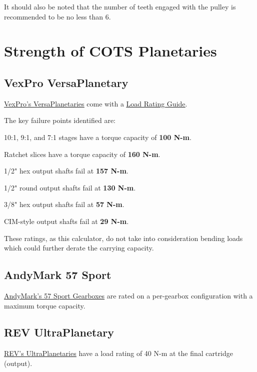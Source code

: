 \documentclass[10pt,letterpaper]{article}
\begin{document}
	It should also be noted that the number of teeth engaged with the pulley is recommended to be no less than 6.

\section{Strength of COTS Planetaries}
	\subsection{VexPro VersaPlanetary}
	\href{https://www.vexrobotics.com/versaplanetary.html}{\underline{VexPro's VersaPlanetaries}} come with a \href{https://docs.google.com/gview?url=http://link.vex.com/vexpro/pdf/VersaPlanetary-LoadRatings}{\underline{Load Rating Guide}}.

	The key failure points identified are:
	\begin{asparaitem}
		\item 10:1, 9:1, and 7:1 stages have a torque capacity of \textbf{100 N-m}.
		\item Ratchet slices have a torque capacity of \textbf{160 N-m}.
		\item 1/2" hex output shafts fail at \textbf{157 N-m}.
		\item 1/2" round output shafts fail at \textbf{130 N-m}.
		\item 3/8" hex output shafts fail at \textbf{57 N-m}.
		\item CIM-style output shafts fail at \textbf{29 N-m}.
	\end{asparaitem}

	These ratings, as this calculator, do not take into consideration bending loads which could further derate the carrying capacity.

	\subsection{AndyMark 57 Sport}
	\href{https://www.andymark.com/products/57-sport-options}{\underline{AndyMark's 57 Sport Gearboxes}} are rated on a per-gearbox configuration with a maximum torque capacity.

	\subsection{REV UltraPlanetary}
	\href{https://www.revrobotics.com/rev-41-1600/}{\underline{REV's UltraPlanetaries}} have a load rating of 40 N-m at the final cartridge (output).
	
\end{document}
